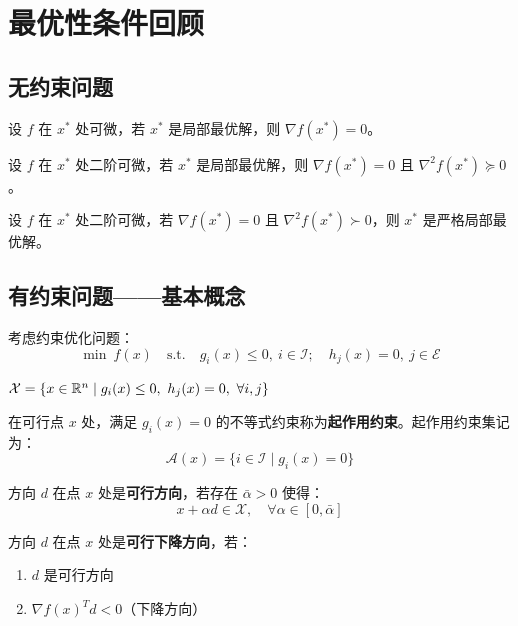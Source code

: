 \section{最优性条件回顾}\label{sec:optimality}

\subsection{无约束问题}

\begin{theorem}[无约束一阶必要条件]
设 $f$ 在 $x^*$ 处可微，若 $x^*$ 是局部最优解，则 $\nabla f(x^*) = 0$。
\end{theorem}

\begin{theorem}[无约束二阶必要条件]
设 $f$ 在 $x^*$ 处二阶可微，若 $x^*$ 是局部最优解，则 $\nabla f(x^*) = 0$ 且 $\nabla^2 f(x^*) \succeq 0$。
\end{theorem}

\begin{theorem}[无约束二阶充分条件]
设 $f$ 在 $x^*$ 处二阶可微，若 $\nabla f(x^*) = 0$ 且 $\nabla^2 f(x^*) \succ 0$，则 $x^*$ 是严格局部最优解。
\end{theorem}

\subsection{有约束问题——基本概念}

考虑约束优化问题：
\[
\min\ f(x)\quad \text{s.t.}\quad g_i(x) \leq 0,\ i \in \mathcal{I};\quad h_j(x) = 0,\ j \in \mathcal{E}
\]

\begin{definition}[可行域]
$\mathcal{X} = \{x \in \mathbb{R}^n \mid g_i(x) \leq 0,\ h_j(x) = 0,\ \forall i, j\}$
\end{definition}

\begin{definition}
在可行点 $x$ 处，满足 $g_i(x) = 0$ 的不等式约束称为\textbf{起作用约束}。起作用约束集记为：
\[
\mathcal{A}(x) = \{i \in \mathcal{I} \mid g_i(x) = 0\}
\]
\end{definition}

\begin{definition}[可行方向]
方向 $d$ 在点 $x$ 处是\textbf{可行方向}，若存在 $\bar{\alpha} > 0$ 使得：
\[
x + \alpha d \in \mathcal{X},\quad \forall \alpha \in [0, \bar{\alpha}]
\]
\end{definition}

\begin{definition}[可行下降方向]
方向 $d$ 在点 $x$ 处是\textbf{可行下降方向}，若：
\begin{enumerate}[label=(\arabic*)]
    \item $d$ 是可行方向
    \item $\nabla f(x)^T d < 0$（下降方向）
\end{enumerate}
\end{definition}

